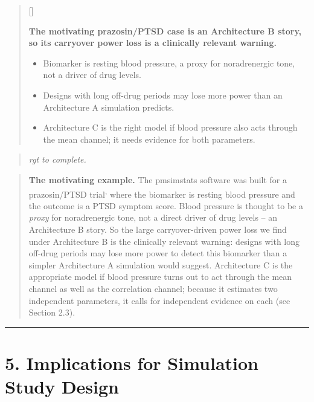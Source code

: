 \documentclass[
  11pt,
]{article}
\newcounter{pgraph}
\newenvironment{bullets}{%
  \stepcounter{pgraph}%
  \begin{quote}\small\sffamily\color[gray]{0.30}%
  {\normalfont\scriptsize\color[gray]{0.58}[\thepgraph]\enspace}}{%
  \end{quote}}
\newenvironment{rgt}{%
  \begin{quote}\small\itshape\color[RGB]{20,60,160}}{%
  \end{quote}}
\newenvironment{orig}{%
  \begin{quote}\normalsize\color[gray]{0.55}}{%
  \end{quote}}
\begin{document}
\begin{bullets}

\textbf{The motivating prazosin/PTSD case is an Architecture B
story, so its carryover power loss is a clinically relevant
warning.}

\begin{itemize}\setlength{\itemsep}{2pt}\setlength{\parskip}{0pt}
\item Biomarker is resting blood pressure, a proxy for noradrenergic
tone, not a driver of drug levels.
\item Designs with long off-drug periods may lose more power than an
Architecture A simulation predicts.
\item Architecture C is the right model if blood pressure also acts
through the mean channel; it needs evidence for both parameters.
\end{itemize}

\end{bullets}

\begin{rgt}
rgt to complete.

\end{rgt}

\begin{orig}
\textbf{The motivating example.} The pmsimstats software was built for a
prazosin/PTSD
trial\textsuperscript{,}
where the biomarker is resting blood pressure and the outcome is a PTSD
symptom score. Blood pressure is thought to be a \emph{proxy} for
noradrenergic tone, not a direct driver of drug levels -- an
Architecture B story. So the large carryover-driven power loss we find
under Architecture B is the clinically relevant warning: designs with
long off-drug periods may lose more power to detect this biomarker than
a simpler Architecture A simulation would suggest. Architecture C is the
appropriate model if blood pressure turns out to act through the mean
channel as well as the correlation channel; because it estimates two
independent parameters, it calls for independent evidence on each (see
Section 2.3).

\end{orig}

\bigskip\noindent

\rule{\textwidth}{0.4pt}\bigskip

\section{5. Implications for Simulation Study Design}
\end{document}
